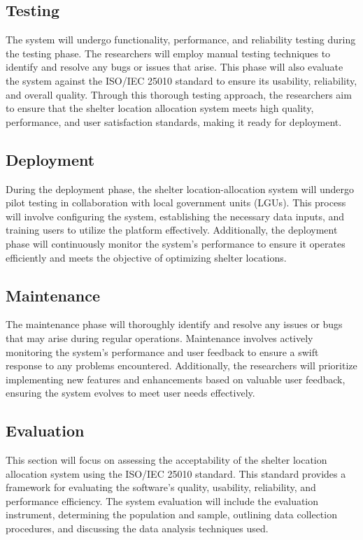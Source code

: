 \subsection{Testing}
	The system will undergo functionality, performance, and reliability testing during the testing phase. The researchers will employ manual testing techniques to identify and resolve any bugs or issues that arise. This phase will also evaluate the system against the ISO/IEC 25010 standard to ensure its usability, reliability, and overall quality. Through this thorough testing approach, the researchers aim to ensure that the shelter location allocation system meets high quality, performance, and user satisfaction standards, making it ready for deployment.
	
\subsection{Deployment}
	During the deployment phase, the shelter location-allocation system will undergo pilot testing in collaboration with local government units (LGUs). This process will involve configuring the system, establishing the necessary data inputs, and training users to utilize the platform effectively. Additionally, the deployment phase will continuously monitor the system's performance to ensure it operates efficiently and meets the objective of optimizing shelter locations. 

\subsection{Maintenance}
	The maintenance phase will thoroughly identify and resolve any issues or bugs that may arise during regular operations. Maintenance involves actively monitoring the system's performance and user feedback to ensure a swift response to any problems encountered. Additionally, the researchers will prioritize implementing new features and enhancements based on valuable user feedback, ensuring the system evolves to meet user needs effectively.
	
\subsection{Evaluation}
	This section will focus on assessing the acceptability of the shelter location allocation system using the ISO/IEC 25010 standard. This standard provides a framework for evaluating the software's quality, usability, reliability, and performance efficiency. The system evaluation will include the evaluation instrument, determining the population and sample, outlining data collection procedures, and discussing the data analysis techniques used.

